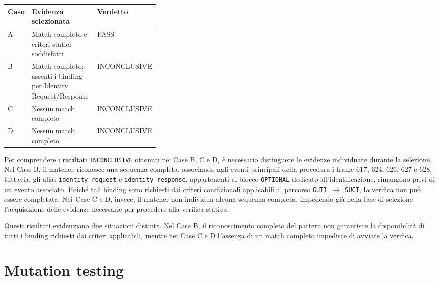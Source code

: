 \begin{center}
\begin{minipage}{0.93\textwidth}
\centering
\begingroup
\small
\setlength{\tabcolsep}{4pt}
\renewcommand{\arraystretch}{1.18}
\begin{tabularx}{\linewidth}{|>{\centering\arraybackslash}p{0.08\linewidth}|>{\raggedright\arraybackslash}X|>{\centering\arraybackslash}p{0.27\linewidth}|}
\hline
\rowcolor{blue!7}
\textbf{Caso} & \textbf{Evidenza selezionata} & \textbf{Verdetto} \\
\hline
A & Match completo e criteri statici soddisfatti & PASS \\
\hline
B & Match completo; assenti i binding per Identity Request/Response & INCONCLUSIVE \\
\hline
C & Nessun match completo & INCONCLUSIVE \\
\hline
D & Nessun match completo & INCONCLUSIVE \\
\hline
\end{tabularx}
\endgroup
{}
\label{tab:res-open5gs}
\end{minipage}
\end{center}


Per comprendere i risultati \texttt{INCONCLUSIVE} ottenuti nei Case B, C e D, è necessario distinguere le evidenze individuate durante la selezione. Nel Case B, il matcher riconosce una sequenza completa, associando agli eventi principali della procedura i frame 617, 624, 626, 627 e 628; tuttavia, gli alias \texttt{identity\_request} e \texttt{identity\_response}, appartenenti al blocco \texttt{OPTIONAL} dedicato all'identificazione, rimangono privi di un evento associato. Poiché tali binding sono richiesti dai criteri condizionali applicabili al percorso \mbox{\texttt{GUTI} $\rightarrow$ \texttt{SUCI}}, la verifica non può essere completata. Nei Case C e D, invece, il matcher non individua alcuna sequenza completa, impedendo già nella fase di selezione l'acquisizione delle evidenze necessarie per procedere alla verifica statica.

Questi risultati evidenziano due situazioni distinte. Nel Case B, il riconoscimento completo del pattern non garantisce la disponibilità di tutti i binding richiesti dai criteri applicabili, mentre nei Case C e D l'assenza di un match completo impedisce di avviare la verifica.


\section{Mutation testing}\label{mutation-testing}

